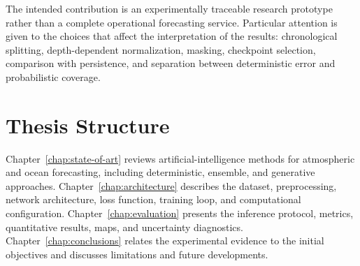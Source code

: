 The intended contribution is an experimentally traceable research prototype rather than a complete operational forecasting service. Particular attention is given to the choices that affect the interpretation of the results: chronological splitting, depth-dependent normalization, masking, checkpoint selection, comparison with persistence, and separation between deterministic error and probabilistic coverage.

\section{Thesis Structure}

Chapter~\ref{chap:state-of-art} reviews artificial-intelligence methods for atmospheric and ocean forecasting, including deterministic, ensemble, and generative approaches. Chapter~\ref{chap:architecture} describes the dataset, preprocessing, network architecture, loss function, training loop, and computational configuration. Chapter~\ref{chap:evaluation} presents the inference protocol, metrics, quantitative results, maps, and uncertainty diagnostics. Chapter~\ref{chap:conclusions} relates the experimental evidence to the initial objectives and discusses limitations and future developments.
